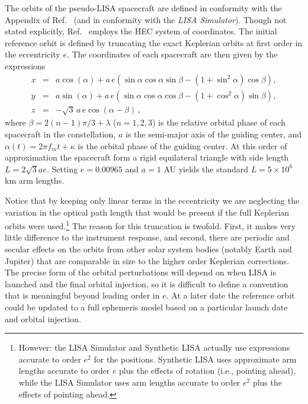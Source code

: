 \documentclass[11pt]{report}
\begin{document}
The orbits of the pseudo-LISA spacecraft are defined in conformity with the Appendix of Ref.~\cite{cr2003}
(and in conformity with the \emph{LISA Simulator}). Though not stated explicitly, Ref.~\cite{cr2003} employs the
HEC system of coordinates. The initial reference orbit is defined by
truncating the exact Keplerian orbits at first order in the eccentricity $e$. The coordinates of each
spacecraft are then given by the expressions
%
\begin{eqnarray}
x &=& a\cos(\alpha) + a \, e\left(\sin\alpha\cos\alpha\sin\beta
-(1+\sin^2\alpha)\cos\beta\right), \nonumber \\
y &=& a\sin(\alpha) + a \, e\left(\sin\alpha\cos\alpha\cos\beta
-(1+\cos^2\alpha)\sin\beta\right), \\
z & = & -\sqrt{3} \, a \, e \cos(\alpha-\beta) \, , \nonumber
\end{eqnarray}
%
where $\beta = 2(n-1)\pi/3 + \lambda$ ($n=1,2,3$) is the relative orbital phase of each spacecraft in the
constellation, $a$ is the semi-major axis of the guiding center, and $\alpha(t)=2\pi f_m t + \kappa$ is
the orbital phase of the guiding center. At this order of approximation the spacecraft form
a rigid equilateral triangle with side length $L = 2\sqrt{3} a e$. Setting $e=0.00965$ and $a = 1$ AU yields
the standard $L=5\times 10^6$ km arm lengths. 

Notice that by keeping only linear terms in the eccentricity we are neglecting the
variation in the optical path length that would be present if the full Keplerian
orbits were used.\footnote{However: the LISA Simulator and Synthetic LISA actually use expressions
accurate to order $e^2$ for the positions. Synthetic LISA uses approximate arm lengths
accurate to order $e$ plus the effects of rotation (i.e., pointing ahead), while the LISA Simulator
uses arm lengths accurate to order $e^2$
plus the effects of pointing ahead.} 
The reason for this truncation is twofold. First,
it makes very little difference to the instrument response, and second, there are
periodic and secular effects on the orbits from other solar system bodies (notably
Earth and Jupiter) that are comparable in size to the higher order Keplerian corrections.
The precise form of the orbital perturbations will depend on when LISA is launched
and the final orbital injection, so it is difficult to define a convention that is
meaningful beyond leading order in $e$. At a later date the reference orbit could be
updated to a full ephemeris model based on a particular launch date and orbital
injection.
\end{document}

